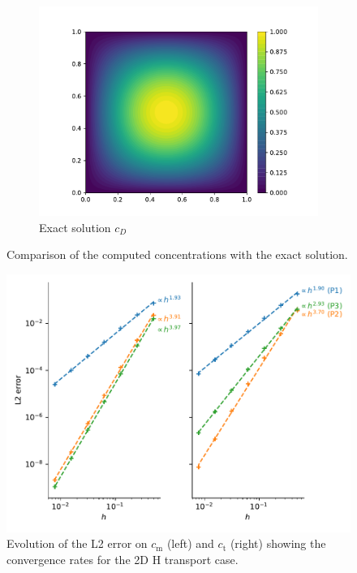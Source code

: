 \begin{figure}
\begin{subfigure}{0.3\linewidth}
        \includegraphics[width=\linewidth]{Figures/Chapter2/c_exact.pdf}
        \caption{Exact solution $c_D$}
    \end{subfigure}
    \caption{Comparison of the computed concentrations with the exact solution.}
    \label{fig: results MMS 2D H transport}
\end{figure}

\begin{figure}
    \centering
    \includegraphics[width=\linewidth]{Figures/Chapter2/convergence_rate_H.pdf}
    \caption{Evolution of the L2 error on $c_\mathrm{m}$ (left) and $c_\mathrm{t}$ (right) showing the convergence rates for the 2D H transport case.}
    \label{fig: convergence rates H}
\end{figure}

